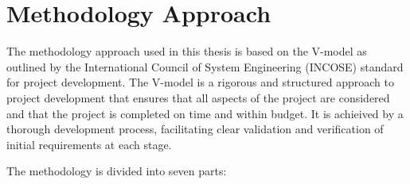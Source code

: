 \chapter{Methodology Approach}

The methodology approach used in this thesis is based on the V-model as outlined by the International Council of System Engineering (INCOSE) standard for project development. The V-model is a rigorous and structured approach to project development that ensures that all aspects of the project are considered and that the project is completed on time and within budget. It is achieived by a thorough development process, facilitating clear validation and verification of initial requirements at each stage.

The methodology is divided into seven parts:


